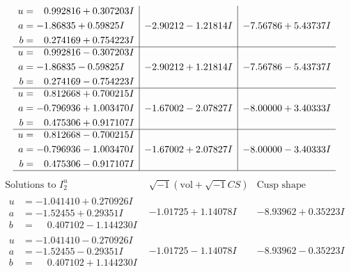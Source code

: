 \documentclass[1p]{elsarticle_modified}
\theoremstyle{definition}
\newcommand{\I}{\sqrt{-1}}
\begin{document}
$$\begin{array}{c|c|c}
\begin{aligned}
u &= \phantom{-}0.992816 + 0.307203 I \\
a &= -1.86835 + 0.59825 I \\
b &= \phantom{-}0.274169 + 0.754223 I\end{aligned}
 & -2.90212 - 1.21814 I & -7.56786 + 5.43737 I \\ \hline\begin{aligned}
u &= \phantom{-}0.992816 - 0.307203 I \\
a &= -1.86835 - 0.59825 I \\
b &= \phantom{-}0.274169 - 0.754223 I\end{aligned}
 & -2.90212 + 1.21814 I & -7.56786 - 5.43737 I \\ \hline\begin{aligned}
u &= \phantom{-}0.812668 + 0.700215 I \\
a &= -0.796936 + 1.003470 I \\
b &= \phantom{-}0.475306 + 0.917107 I\end{aligned}
 & -1.67002 - 2.07827 I & -8.00000 + 3.40333 I \\ \hline\begin{aligned}
u &= \phantom{-}0.812668 - 0.700215 I \\
a &= -0.796936 - 1.003470 I \\
b &= \phantom{-}0.475306 - 0.917107 I\end{aligned}
 & -1.67002 + 2.07827 I & -8.00000 - 3.40333 I\\
 \hline 
 \end{array}$$\newpage$$\begin{array}{c|c|c}  
\text{Solutions to }I^u_{2}& \I (\text{vol} + \sqrt{-1}CS) & \text{Cusp shape}\\
 \hline 
\begin{aligned}
u &= -1.041410 + 0.270926 I \\
a &= -1.52455 + 0.29351 I \\
b &= \phantom{-}0.407102 - 1.144230 I\end{aligned}
 & -1.01725 + 1.14078 I & -8.93962 + 0.35223 I \\ \hline\begin{aligned}
u &= -1.041410 - 0.270926 I \\
a &= -1.52455 - 0.29351 I \\
b &= \phantom{-}0.407102 + 1.144230 I\end{aligned}
 & -1.01725 - 1.14078 I & -8.93962 - 0.35223 I \\ \hline\begin{aligned}

\end{aligned}
\end{array}$$
\end{document}
